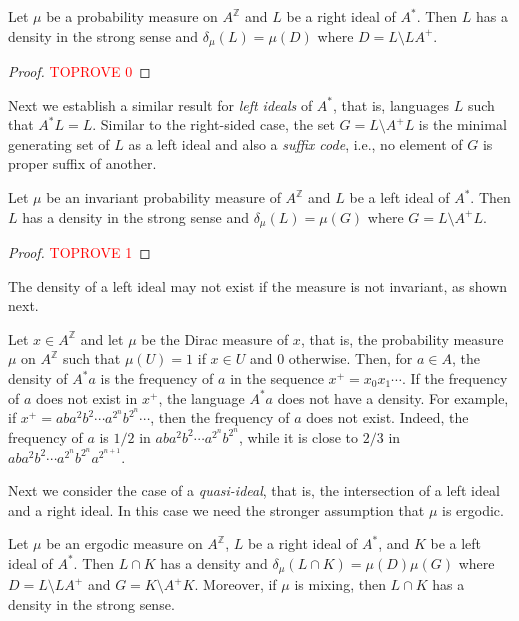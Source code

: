 \documentclass[a4paper,UKenglish,numberwithinsect,cleveref]{lipics-v2021}
\newcommand{\Z}{\mathbb{Z}}
\begin{document}
\begin{proposition}\label{propositionRightIdeal}
    Let $\mu$ be a probability measure on $A^\Z$ and $L$ be a right ideal of $A^*$. Then
    $L$ has a density in the strong sense and $\delta_\mu(L)=\mu(D)$ where $D = L\setminus LA^+$.
\end{proposition}

\begin{proof}\textcolor{red}{TOPROVE 0}\end{proof}

Next we establish a similar result for {\em left ideals} of $A^*$, that is, languages $L$ such that $A^*L=L$. Similar to the right-sided case, the set $G = L\setminus A^+L$ is the minimal generating set of $L$ as a left ideal and also a \emph{suffix code}, i.e., no element of $G$ is proper suffix of another. 
\begin{proposition}\label{propositionLeftIdeal}
    Let $\mu$ be an invariant probability measure of $A^\Z$ and $L$ be a left ideal of $A^*$. Then
    $L$ has a density in the strong sense and $\delta_\mu(L)=\mu(G)$ where $G = L\setminus A^+L$.
\end{proposition}

\begin{proof}\textcolor{red}{TOPROVE 1}\end{proof}

The density of a left ideal may not exist if the measure is not invariant, as shown next.

\begin{example}\label{exampleNotInvariant}
    Let $x\in A^\Z$ and let $\mu$ be the Dirac measure of $x$, that is, the probability measure $\mu$ on $A^\Z$ such that $\mu(U)=1$ if $x\in U$ and $0$ otherwise. Then, for $a\in A$, the density of $A^*a$ is the frequency of $a$ in the sequence $x^+=x_0x_1\cdots$. If the frequency of $a$ does not exist in $x^+$, the language $A^*a$ does not have a density.  For example, if $x^+=aba^2b^2\cdots a^{2^n}b^{2^n}\cdots$, then the frequency of $a$ does not exist. Indeed, the frequency of $a$ is $1/2$ in $aba^2b^2\cdots a^{2^n}b^{2^n}$, while it is close to $2/3$ in $aba^2b^2\cdots a^{2^n}b^{2^n}a^{2^{n+1}}$.
\end{example}

Next we consider the case of a \emph{quasi-ideal}, that is, the intersection of a left
ideal and a right ideal. In this case we need the stronger assumption that $\mu$ is ergodic.

\begin{proposition}\label{propositionQuasiIdeal}
    Let $\mu$ be an ergodic measure on $A^\Z$, $L$ be a right ideal of $A^*$, and $K$ be a left ideal of $A^*$. Then $L\cap K$ has a density and $\delta_\mu(L\cap K)=\mu(D)\mu(G)$ where $D = L\setminus LA^+$ and $G = K\setminus A^+K$. Moreover, if $\mu$ is mixing, then $L\cap K$ has a density in the strong sense.
\end{proposition}
\end{document}
